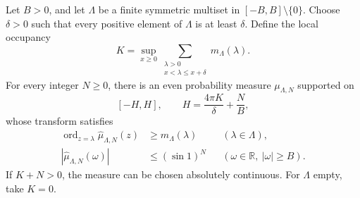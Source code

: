 \begin{theorem}
\label{thm:finite-filter}
Let $B>0$, and let $\Lambda$ be a finite symmetric multiset in
$[-B,B]\setminus\{0\}$. Choose $\delta>0$ such that every positive
element of $\Lambda$ is at least $\delta$. Define the local occupancy
\[
 K=\sup_{x\ge0}\sum_{\substack{\lambda>0\\x<\lambda\le x+\delta}}
                      m_\Lambda(\lambda).
\]
For every integer $N\ge0$, there is an even probability measure
$\mu_{\Lambda,N}$ supported on
\begin{equation}\label{eq:finite-support}
 [-H,H],\qquad H=\frac{4\pi K}{\delta}+\frac NB,
\end{equation}
whose transform satisfies
\begin{align}
 \operatorname{ord}_{z=\lambda}\widehat\mu_{\Lambda,N}(z)
   &\ge m_\Lambda(\lambda)
       &&(\lambda\in\Lambda),\label{eq:jet-zeros}\\
 |\widehat\mu_{\Lambda,N}(\omega)|
   &\le (\sin1)^N
       &&(\omega\in\mathbb R,\ |\omega|\ge B).\label{eq:tail-attenuation}
\end{align}
If $K+N>0$, the measure can be chosen absolutely continuous.
For $\Lambda$ empty, take $K=0$.
\end{theorem}

